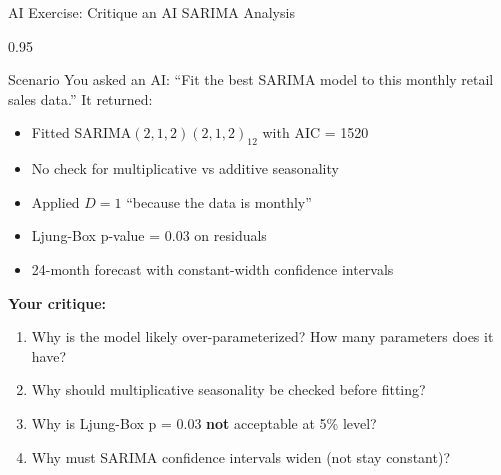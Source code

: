 \documentclass[9pt, aspectratio=169, t]{beamer}
\begin{document}
\begin{frame}{AI Exercise: Critique an AI SARIMA Analysis}
    \begin{cminipage}{0.95\textwidth}
    \begin{block}{Scenario}
        You asked an AI: ``Fit the best SARIMA model to this monthly retail sales data.'' It returned:
        \begin{itemize}\setlength{\itemsep}{0pt}
            \item Fitted SARIMA$(2,1,2)(2,1,2)_{12}$ with AIC = 1520
            \item No check for multiplicative vs additive seasonality
            \item Applied $D=1$ ``because the data is monthly''
            \item Ljung-Box p-value = 0.03 on residuals
            \item 24-month forecast with constant-width confidence intervals
        \end{itemize}
    \end{block}

    \vspace{0.3cm}

    \textbf{Your critique:}
    \begin{enumerate}
        \item Why is the model likely over-parameterized? How many parameters does it have?
        \item Why should multiplicative seasonality be checked before fitting?
        \item Why is Ljung-Box p = 0.03 \textbf{not} acceptable at 5\% level?
        \item Why must SARIMA confidence intervals widen (not stay constant)?
    \end{enumerate}
    \end{cminipage}
\end{frame}
\end{document}
